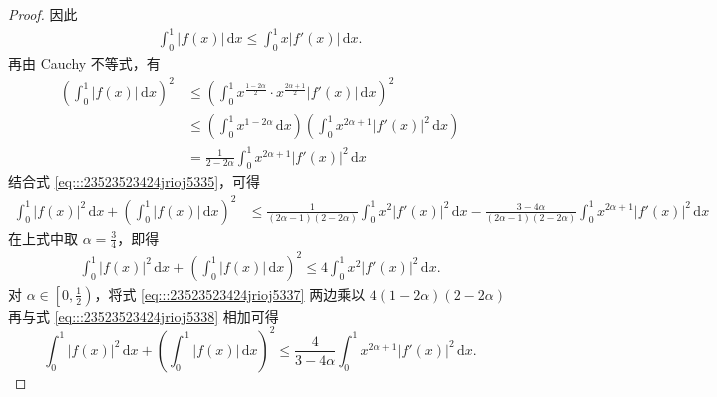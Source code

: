 \documentclass[../../main.tex]{subfiles}%
\begin{document}
\begin{proof}
因此
\begin{align}
\int_{0}^{1} |f(x)| \, \mathrm{d}x \leqslant \int_{0}^{1} x |f'(x)| \, \mathrm{d}x. \label{eq:::23523523424jrioj5336}
\end{align}
再由 Cauchy 不等式，有
\begin{align*}
\left( \int_{0}^{1} |f(x)| \, \mathrm{d}x \right)^2 &\leqslant \left( \int_{0}^{1} x^{\frac{1 - 2\alpha}{2}} \cdot x^{\frac{2\alpha + 1}{2}} |f'(x)| \, \mathrm{d}x \right)^2 \\
&\leqslant \left( \int_{0}^{1} x^{1 - 2\alpha} \, \mathrm{d}x \right) \left( \int_{0}^{1} x^{2\alpha + 1} |f'(x)|^2 \, \mathrm{d}x \right)
\\
&= \frac{1}{2 - 2\alpha} \int_{0}^{1} x^{2\alpha + 1} |f'(x)|^2 \, \mathrm{d}x
\end{align*}
结合式 \eqref{eq:::23523523424jrioj5335}，可得
\begin{align}
\int_{0}^{1} |f(x)|^2 \, \mathrm{d}x + \left( \int_{0}^{1} |f(x)| \, \mathrm{d}x \right)^2 &\leqslant \frac{1}{(2\alpha - 1)(2 - 2\alpha)} \int_{0}^{1} x^2 |f'(x)|^2 \, \mathrm{d}x - \frac{3 - 4\alpha}{(2\alpha - 1)(2 - 2\alpha)} \int_{0}^{1} x^{2\alpha + 1} |f'(x)|^2 \, \mathrm{d}x \label{eq:::23523523424jrioj5337}
\end{align}
在上式中取 \( \alpha = \frac{3}{4} \)，即得
\begin{align}
\int_{0}^{1} |f(x)|^2 \, \mathrm{d}x + \left( \int_{0}^{1} |f(x)| \, \mathrm{d}x \right)^2 \leqslant 4 \int_{0}^{1} x^2 |f'(x)|^2 \, \mathrm{d}x .\label{eq:::23523523424jrioj5338}
\end{align}
对 \( \alpha \in \left[0, \frac{1}{2}\right) \)，将式 \eqref{eq:::23523523424jrioj5337} 两边乘以 \( 4(1 - 2\alpha)(2 - 2\alpha) \) 再与式 \eqref{eq:::23523523424jrioj5338} 相加可得
\[
\int_{0}^{1} |f(x)|^2 \, \mathrm{d}x + \left( \int_{0}^{1} |f(x)| \, \mathrm{d}x \right)^2 \leqslant \frac{4}{3 - 4\alpha} \int_{0}^{1} x^{2\alpha + 1} |f'(x)|^2 \, \mathrm{d}x.
\]

\end{proof}
\end{document}
